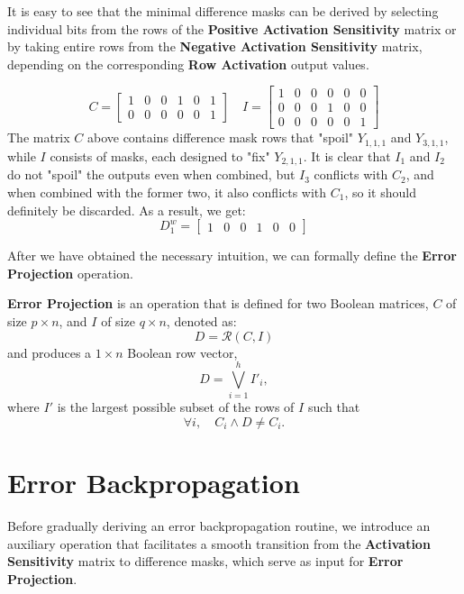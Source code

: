 \documentclass[pmlr]{jmlr}
\begin{document}
It is easy to see that the minimal difference masks can be derived by selecting individual bits from the rows of the \textbf{Positive Activation Sensitivity} matrix or by taking entire rows from the \textbf{Negative Activation Sensitivity} matrix, depending on the corresponding \textbf{Row Activation} output values.

\[
    C = \begin{bmatrix}
        1 & 0 & 0 & 1 & 0 & 1 \\
        0 & 0 & 0 & 0 & 0 & 1
    \end{bmatrix} \quad
    I = \begin{bmatrix}
        1 & 0 & 0 & 0 & 0 & 0 \\
        0 & 0 & 0 & 1 & 0 & 0 \\
        0 & 0 & 0 & 0 & 0 & 1
    \end{bmatrix}
\]
The matrix \( C \) above contains difference mask rows that "spoil" \( Y_{1,1,1} \) and \( Y_{3,1,1} \), while \( I \) consists of masks, each designed to "fix" \( Y_{2,1,1} \). It is clear that \( I_1 \) and \( I_2 \) do not "spoil" the outputs even when combined, but \( I_3 \) conflicts with \( C_2 \), and when combined with the former two, it also conflicts with \( C_1 \), so it should definitely be discarded. As a result, we get:
\[
    D^w_1 = \begin{bmatrix} 1 & 0 & 0 & 1 & 0 & 0 \end{bmatrix}
\]

After we have obtained the necessary intuition, we can formally define the \textbf{Error Projection} operation.

\begin{definition}
    \textbf{Error Projection} is an operation that is defined for two Boolean matrices, \( C \) of size \( p \times n \), and \( I \) of size \( q \times n \), denoted as:
    \[ D = \mathcal{R}(C, I) \]
    and produces a \( 1 \times n \) Boolean row vector,
    \[ D = \bigvee_{i=1}^{h} I'_{i}, \]
    where \( I' \) is the largest possible subset of the rows of \( I \) such that
    \[ \forall i, \quad C_i \wedge D \neq C_i. \]
\end{definition}

\section{Error Backpropagation}
Before gradually deriving an error backpropagation routine, we introduce an auxiliary operation that facilitates a smooth transition from the \textbf{Activation Sensitivity} matrix to difference masks, which serve as input for \textbf{Error Projection}.
\end{document}
